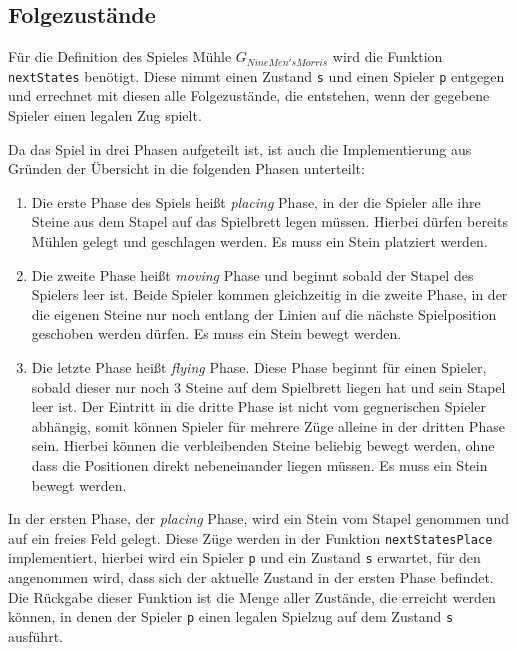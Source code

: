 \documentclass[11pt]{article}
\begin{document}
    \hypertarget{folgezustuxe4nde}{%
\subsection{Folgezustände}\label{folgezustuxe4nde}}

Für die Definition des Spieles Mühle \(G_{Nine Men's Morris}\) wird die
Funktion \texttt{nextStates} benötigt. Diese nimmt einen Zustand
\texttt{s} und einen Spieler \texttt{p} entgegen und errechnet mit
diesen alle Folgezustände, die entstehen, wenn der gegebene Spieler
einen legalen Zug spielt.

Da das Spiel in drei Phasen aufgeteilt ist, ist auch die Implementierung
aus Gründen der Übersicht in die folgenden Phasen unterteilt:

\begin{enumerate}
    \item Die
    erste Phase des Spiels heißt \emph{placing} Phase, in der die Spieler
    alle ihre Steine aus dem Stapel auf das Spielbrett legen müssen. Hierbei
    dürfen bereits Mühlen gelegt und geschlagen werden. Es muss ein Stein
    platziert werden.
    \item Die zweite Phase heißt \emph{moving} Phase und
    beginnt sobald der Stapel des Spielers leer ist. Beide Spieler kommen
    gleichzeitig in die zweite Phase, in der die eigenen Steine nur noch
    entlang der Linien auf die nächste Spielposition geschoben werden
    dürfen. Es muss ein Stein bewegt werden.
    \item Die letzte Phase heißt
    \emph{flying} Phase. Diese Phase beginnt für einen Spieler, sobald
    dieser nur noch \(3\) Steine auf dem Spielbrett liegen hat und sein
    Stapel leer ist. Der Eintritt in die dritte Phase ist nicht vom
    gegnerischen Spieler abhängig, somit können Spieler für mehrere Züge
    alleine in der dritten Phase sein. Hierbei können die verbleibenden
    Steine beliebig bewegt werden, ohne dass die Positionen direkt
    nebeneinander liegen müssen. Es muss ein Stein bewegt werden.
\end{enumerate}

In der ersten Phase, der \emph{placing} Phase, wird ein Stein vom Stapel
genommen und auf ein freies Feld gelegt. Diese Züge werden in der
Funktion \texttt{nextStatesPlace} implementiert, hierbei wird ein
Spieler \texttt{p} und ein Zustand \texttt{s} erwartet, für den
angenommen wird, dass sich der aktuelle Zustand in der ersten Phase
befindet. Die Rückgabe dieser Funktion ist die Menge aller Zustände, die
erreicht werden können, in denen der Spieler \texttt{p} einen legalen
Spielzug auf dem Zustand \texttt{s} ausführt.
\end{document}
